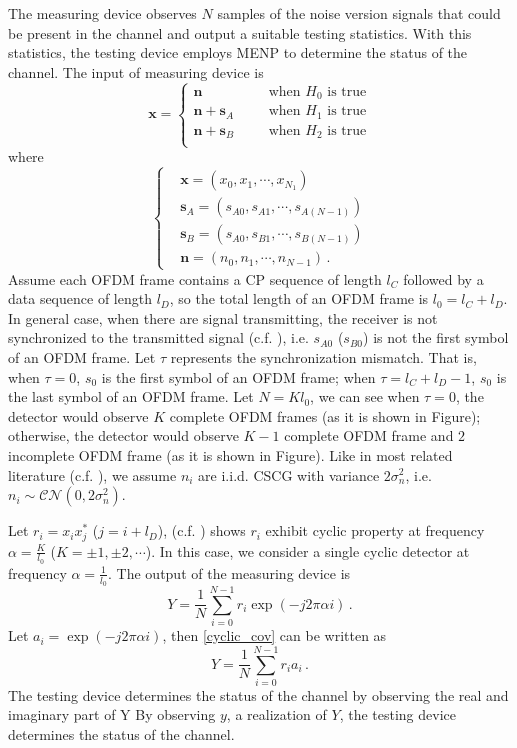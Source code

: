 The measuring device observes $N$ samples of the noise version signals that could be present in the channel and output a suitable testing statistics. With this statistics, the testing device employs MENP to determine the status of the channel. The input of measuring device is
\begin{equation}
  \mathbf{x} = \begin{cases}
	\mathbf{n}\;\;\;\;\;\;&\text{when $H_0$ is true}\\
	\mathbf{n}+\mathbf{s}_A\;\;\;\;\;\;&\text{when $H_1$ is true}\\
	\mathbf{n}+\mathbf{s}_B\;\;\;\;\;\;&\text{when $H_2$ is true}\\
  \end{cases}
  \label{equ:1209a1}
\end{equation}
where 
\begin{equation}
  \begin{cases}
	&\mathbf{x} = (x_0, x_1, \cdots, x_{N_1})\\
	&\mathbf{s}_A = (s_{A0}, s_{A1}, \cdots, s_{A(N-1)})\\
	&\mathbf{s}_B = (s_{A0}, s_{B1}, \cdots, s_{B(N-1)})\\
	&\mathbf{n} = (n_{0}, n_{1}, \cdots, n_{N-1})\,.
  \end{cases}
  \label{xssn}
\end{equation}
Assume each OFDM frame contains a CP sequence of length $l_C$ followed by a data sequence of length $l_D$, so the total length of an OFDM frame is $l_0 = l_C+l_D$. In general case, when there are signal transmitting, the receiver is not synchronized to the transmitted signal (c.f. ), i.e. $s_{A0}$ ($s_{B0}$) is not the first symbol of an OFDM frame. Let $\tau$ represents the synchronization mismatch. That is, when $\tau = 0$, $s_0$ is the first symbol of an OFDM frame; when $\tau = l_C+l_D -1$, $s_0$ is the last symbol of an OFDM frame. Let $N = Kl_0$, we can see when $\tau=0$, the detector would observe $K$ complete  OFDM frames (as it is shown in Figure); otherwise, the detector would observe $K-1$ complete OFDM frame and $2$ incomplete OFDM frame (as it is shown in Figure). Like in most related literature (c.f. ), we assume  $n_i$ are i.i.d. CSCG with variance $2\sigma_n^2$, i.e. $n_i \sim \mathcal{CN}(0, 2\sigma_n^2)$. 

Let $r_i=x_ix_j^\ast$ ($j=i+l_D$), (c.f. ) shows $r_i$ exhibit cyclic property at frequency $\alpha = \frac{K}{l_0}$ ($K = \pm1, \pm2, \cdots$). In this case, we consider a single cyclic detector at frequency $\alpha = \frac{1}{l_0}$. The output of the measuring device is 
\begin{equation}
  Y = \frac{1}{N}\sum_{i=0}^{N-1} r_i\exp(-j2\pi\alpha i)\,.
  \label{cyclic_cov}
\end{equation}
Let $a_i = \exp(-j2\pi\alpha i)$, then \eqref{cyclic_cov} can be written as
\begin{equation}
  Y = \frac{1}{N}\sum_{i=0}^{N-1} r_ia_i\,.
  \label{cyclic_cov_2}
\end{equation}
The testing device determines the status of the channel by observing the real and imaginary part of Y
By observing $y$, a realization  of $Y$, the testing device determines the status of the channel.

